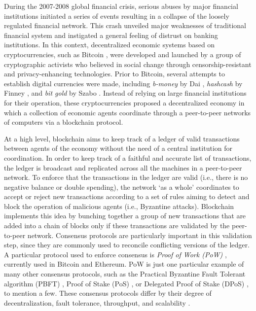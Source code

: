 \documentclass[letterpaper, 10 pt, conference]{ieeeconf}  %
\begin{document}
During the 2007-2008 global financial crisis, serious abuses by major financial institutions initiated a series of events resulting in a collapse of the loosely regulated financial network. This crash unveiled major weaknesses of traditional financial system and instigated a general feeling of distrust on banking institutions. In this context, decentralized economic systems based on cryptocurrencies, such as Bitcoin \cite{nakamoto2008bitcoin}, were developed and launched by a group of cryptographic activists who believed in social change through censorship-resistant and privacy-enhancing technologies. Prior to Bitcoin, several attempts to establish digital currencies were made, including  \emph{b-money} by Dai \cite{dai1998bmoney}, \emph{hashcash} by Finney \cite{back2002hashcash}, and \emph{bit gold} by Szabo \cite{szabo2005bitgold}. Instead of relying on large financial institutions for their operation, these cryptocurrencies proposed a decentralized economy in which a collection of economic agents coordinate through a peer-to-peer networks of computers via a blockchain protocol.

At a high level, blockchain aims to keep track of a ledger of valid transactions between agents of the economy without the need of a central institution for coordination. In order to keep track of a faithful and accurate list of transactions, the ledger is broadcast and replicated across all the machines in a peer-to-peer network. To enforce that the transactions in the ledger are valid (i.e., there is no negative balance or double spending), the network `as a whole' coordinates to accept or reject new transactions according to a set of rules aiming to detect and block the operation of malicious agents (i.e., Byzantine attacks). Blockchain implements this idea by bunching together a group of new transactions that are added into a chain of blocks only if these transactions are validated by the peer-to-peer network. Consensus protocols are particularly important in this validation step, since they are commonly used to reconcile conflicting versions of the ledger. A particular protocol used to enforce consensus is \emph{Proof of Work (PoW)} \cite{bentov2014cryptocurrencies}, currently used in Bitcoin and Ethereum. PoW is just one particular example of many other consensus protocols, such as the Practical Byzantine Fault Tolerant algorithm (PBFT) \cite{castro1999practical}, Proof of Stake (PoS) \cite{ethereum-pos}, or Delegated Proof of Stake (DPoS) \cite{bitshares-dpos}, to mention a few. These consensus protocols differ by their degree of decentralization, fault tolerance, throughput, and scalability \cite{consensus-review}. 
\end{document}
